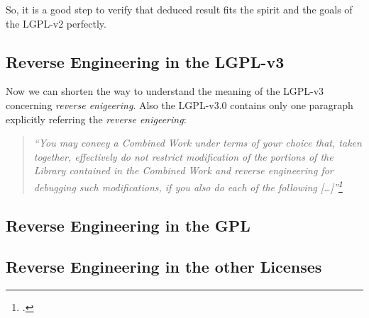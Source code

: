 So, it is a good step to verify that deduced result fits the spirit and the
goals of the LGPL-v2 perfectly.


\subsection{Reverse Engineering in the LGPL-v3}

Now we can shorten the way to understand the meaning of the LGPL-v3 concerning
\emph{reverse enigeering}. Also the LGPL-v3.0 contains only one paragraph
explicitly referring the \emph{reverse enigeering}:


\begin{quote}\emph{
\enquote{You may convey a Combined Work under terms of your choice that,
taken together, effectively \emph{do not restrict} modification of the portions
of the Library contained in the Combined Work and \emph{reverse engineering} for
debugging such modifications, if you also do each of the following
[\ldots]}\footcite[cf.][\nopage wp]{Lgpl30OsiLicense2007a}}
\end{quote}


\subsection{Reverse Engineering in the GPL}

\subsection{Reverse Engineering in the other Licenses}













%
